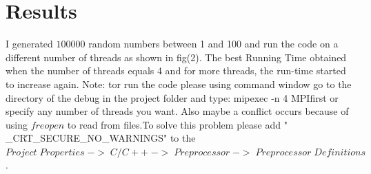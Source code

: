 \documentclass[preprint,pre,floats,aps,amsmath,amssymb]{revtex4}
\begin{document}
\section{Results}
\label{sec:results}

I generated $100000$ random numbers between 1 and 100 and run the code on a different number of threads as shown in fig(2). The best Running Time obtained when the number of threads equals 4 and for more threads, the run-time started to increase again.
Note:
tor run the code please using command window go to the directory of the debug in the project folder and type:\newline
mipexec -n 4 MPIfirst\newline
or specify any number of threads you want. Also maybe a conflict occurs because of using $ freopen$ to read from files.To solve this problem please add " \_CRT\_SECURE\_NO\_WARNINGS" to the $ Project\; Properties\; ->\; C/C++\;->\;Preprocessor\;->\;Preprocessor\;Definitions $. 

\newpage
\end{document}
